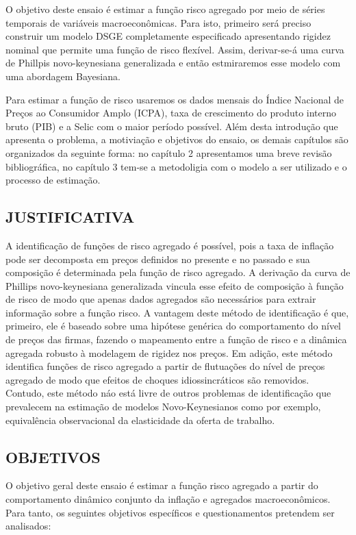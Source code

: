 \documentclass[twoside,a4paper,11pt]{report}
\begin{document}
O objetivo deste ensaio é estimar a função risco agregado por meio de séries temporais de variáveis macroeconômicas. Para isto, primeiro será preciso construir um modelo DSGE completamente especificado apresentando rigidez nominal que permite uma função de risco flexível. Assim, derivar-se-á uma curva de Phillpis novo-keynesiana generalizada e então estmiraremos esse modelo com uma abordagem Bayesiana. 

Para estimar a função de risco usaremos os dados mensais do Índice Nacional de Preços ao Consumidor Amplo (ICPA), taxa de crescimento do produto interno bruto (PIB) e a Selic com o maior período possível. Além desta introdução que apresenta o problema, a motiviação e objetivos do ensaio, os demais capítulos são organizados da seguinte forma: no capítulo 2 apresentamos uma breve revisão bibliográfica, no capítulo 3 tem-se a metodoligia com o modelo a ser utilizado e o processo de estimação.

\subsection*{JUSTIFICATIVA}

A identificação de funções de risco agregado é possível, pois a taxa de inflação pode ser decomposta em preços definidos no presente e no passado e sua composição é determinada pela função de risco agregado. A derivação da curva de Phillips novo-keynesiana generalizada vincula esse efeito de composição à função de risco de modo que apenas dados agregados são necessários para extrair informação sobre a função risco. A vantagem deste método de identificação é que, primeiro, ele é baseado sobre uma hipótese genérica do comportamento do nível de preços das firmas, fazendo o mapeamento entre a função de risco e a dinâmica agregada robusto à modelagem de rigidez nos preços. Em adição, este método identifica funções de risco agregado a partir de flutuações do nível de preços agregado de modo que efeitos de choques idiossincráticos são removidos. Contudo, este método náo está livre de outros problemas de identificação que prevalecem na estimação de modelos Novo-Keynesianos como por exemplo, equivalência observacional da elasticidade da oferta de trabalho. 

\subsection*{OBJETIVOS}

O objetivo geral deste ensaio é estimar a função risco agregado a partir do comportamento dinâmico conjunto da inflação e agregados macroeconômicos. Para tanto, os seguintes objetivos específicos e questionamentos pretendem ser analisados:
\end{document}
